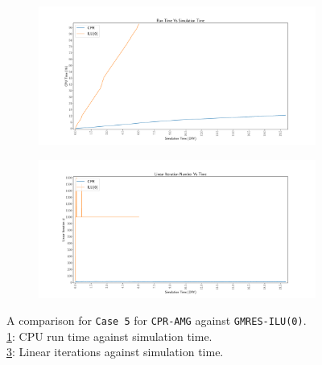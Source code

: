 \begin{figure}
\centering
\begin{subfigure}[b]{\textwidth}
   \includegraphics[width=1\linewidth]{figures/viscous/320x320/cpu_time.pdf}
   \caption{}
   \label{viscous320_cpu}
\end{subfigure}

\begin{subfigure}[b]{\textwidth}
   \includegraphics[width=1\linewidth]{figures/viscous/320x320/its_time.pdf}
   \caption{}
   \label{viscous320_its}
\end{subfigure}

\caption[caption]{A comparison for \texttt{Case 5} for \texttt{CPR-AMG} against \texttt{GMRES-ILU(0)}.\\\hspace{\textwidth}
	\cref{viscous320_cpu}: CPU run time against simulation time. \\\hspace{\textwidth}
	\cref{viscous320_its}: Linear iterations against simulation time.\\\hspace{\textwidth}}
\end{figure}

